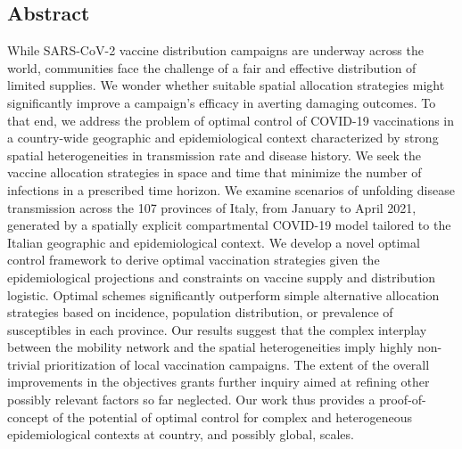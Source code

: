 \begin{fullwidth}
\section{Abstract}
While SARS-CoV-2 vaccine distribution campaigns are underway across the world, communities face the challenge of a fair and effective distribution of limited supplies. We wonder whether suitable spatial allocation strategies might significantly improve a campaign's efficacy in averting damaging outcomes. To that end, we address the problem of optimal control of COVID-19 vaccinations in a country-wide geographic and epidemiological context characterized by strong spatial heterogeneities in transmission rate and disease history. We seek the vaccine allocation strategies in space and time that minimize the number of infections in a prescribed time horizon. We examine scenarios of unfolding disease transmission across the 107 provinces of Italy, from January to April 2021, generated by a spatially explicit compartmental COVID-19 model tailored to the Italian geographic and epidemiological context. We develop a novel optimal control framework to derive optimal vaccination strategies given the epidemiological projections and constraints on vaccine supply and distribution logistic. Optimal schemes significantly outperform simple alternative allocation strategies based on incidence, population distribution, or prevalence of susceptibles in each province. Our results suggest that the complex interplay between the mobility network and the spatial heterogeneities imply highly non-trivial prioritization of local vaccination campaigns. The extent of the overall improvements in the objectives grants further inquiry aimed at refining other possibly relevant factors so far neglected. Our work thus provides a proof-of-concept of the potential of optimal control for complex and heterogeneous epidemiological contexts at country, and possibly global, scales.
\end{fullwidth}




